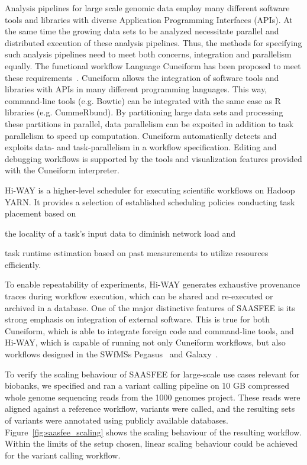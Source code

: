 Analysis pipelines for large scale genomic data employ many different software tools and libraries with diverse Application Programming Interfaces (APIs). At the same time the growing data sets to be analyzed necessitate parallel and distributed execution of these analysis pipelines. Thus, the methods for specifying such analysis pipelines need to meet both concerns, integration and parallelism equally. The functional workflow Language Cuneiform has been proposed to meet these requirements~\cite{Brandt2015}. Cuneiform allows the integration of software tools and libraries with APIs in many different programming languages. This way, command-line tools (e.g. Bowtie) can be integrated with the same ease as R libraries (e.g. CummeRbund). By partitioning large data sets and processing these partitions in parallel, data parallelism can be expoited in addition to task parallelism to speed up computation. Cuneiform automatically detects and exploits data- and task-parallelism in a workflow specification. Editing and debugging workflows is supported by the tools and visualization features provided with the Cuneiform interpreter.




Hi-WAY is a higher-level scheduler for executing scientific workflows on Hadoop YARN. It provides a selection of established scheduling policies conducting task placement based on
\begin{inparaenum}[(a)]
  \item the locality of a task's input data to diminish network load and
  \item task runtime estimation based on past measurements to utilize resources efficiently.
\end{inparaenum}
To enable repeatability of experiments, Hi-WAY generates exhaustive provenance traces during workflow execution, which can be shared and re-executed or archived in a database. One of the major distinctive features of SAASFEE is its strong emphasis on integration of external software. This is true for both Cuneiform, which is able to integrate foreign code and command-line tools, and Hi-WAY, which is capable of running not only Cuneiform workflows, but also workflows designed in the SWfMSs Pegasus~\cite{pegasus_fgcs} and Galaxy~\cite{Goecks10}.

To verify the scaling behaviour of SAASFEE for large-scale use cases relevant for biobanks, we specified and ran a variant calling pipeline on 10 GB compressed whole genome sequencing reads from the 1000 genomes project. These reads were aligned against a reference workflow, variants were called, and the resulting sets of variants were annotated using publicly available databases. Figure~\ref{fig:saasfee_scaling} shows the scaling behaviour of the resulting workflow. Within the limits of the setup chosen, linear scaling behaviour could be achieved for the variant calling workflow.




